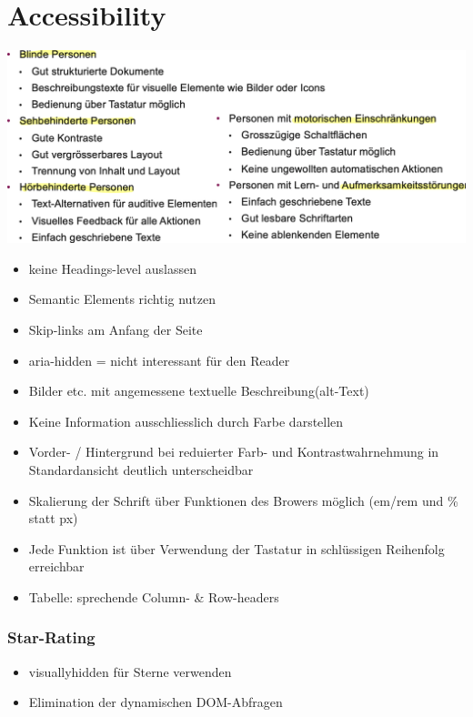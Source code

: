 
\section{Accessibility}
\begin{center}
    \includegraphics[scale=.2]{graphic/accessability/barrierefreien.png}
\end{center}
\vspace{-8pt}

\begin{itemize}
    \item keine Headings-level auslassen
    \item Semantic Elements richtig nutzen
    \item Skip-links am Anfang der Seite
    \item aria-hidden = nicht interessant für den Reader
    \item Bilder etc. mit angemessene textuelle Beschreibung(alt-Text)
    \item Keine Information ausschliesslich durch Farbe darstellen
    \item Vorder- / Hintergrund bei reduierter Farb- und Kontrastwahrnehmung in Standardansicht deutlich unterscheidbar
    \item Skalierung der Schrift über Funktionen des Browers möglich (em/rem und \% statt px)
    \item Jede Funktion ist über Verwendung der Tastatur in schlüssigen Reihenfolg erreichbar
    \item Tabelle: sprechende Column- \& Row-headers 
\end{itemize}


\subsubsection{Star-Rating}
\begin{itemize}
    \item visuallyhidden für Sterne verwenden
    \item Elimination der dynamischen DOM-Abfragen
\end{itemize}


